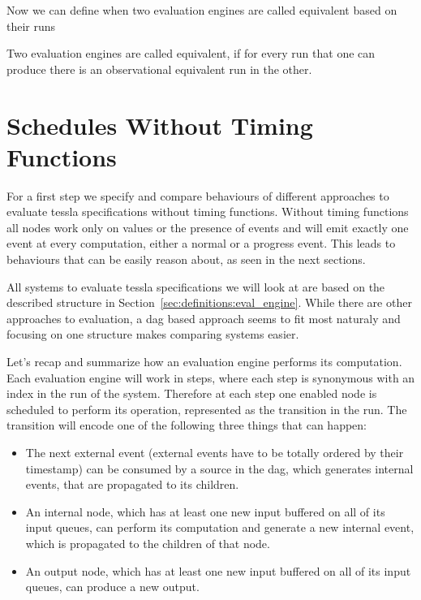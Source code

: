 Now we can define when two evaluation engines are called equivalent based on their runs

\begin{definition}[name=Equivalence of Evaluation Engines]\label{def:equivalence_eval_engine}
  Two evaluation engines are called equivalent, if for every run that one can produce there is an observational equivalent run in the other.
\end{definition}

\section{Schedules Without Timing Functions}
\label{sec:behaviours:without_timing}

For a first step we specify and compare behaviours of different approaches to evaluate \gls{tessla} specifications without timing functions.
Without timing functions all nodes work only on values or the presence of events and will emit exactly one event at every computation, either a normal or a progress event.
This leads to behaviours that can be easily reason about, as seen in the next sections.

All systems to evaluate \gls{tessla} specifications we will look at are based on the described structure in Section~\ref{sec:definitions:eval_engine}.
While there are other approaches to evaluation, a \gls{dag} based approach seems to fit most naturaly and focusing on one structure makes comparing systems easier.

Let's recap and summarize how an evaluation engine performs its computation.
Each evaluation engine will work in steps, where each step is synonymous with an index in the run of the system.
Therefore at each step one enabled node is scheduled to perform its operation, represented as the transition in the run.
The transition will encode one of the following three things that can happen:

\begin{itemize}
  \item The next external event (external events have to be totally ordered by their timestamp) can be consumed by a source in the \gls{dag}, which generates internal events, that are propagated to its children.
  \item An internal node, which has at least one new input buffered on all of its input queues, can perform its computation and generate a new internal event, which is propagated to the children of that node.
  \item An output node, which has at least one new input buffered on all of its input queues, can produce a new output.
\end{itemize}

